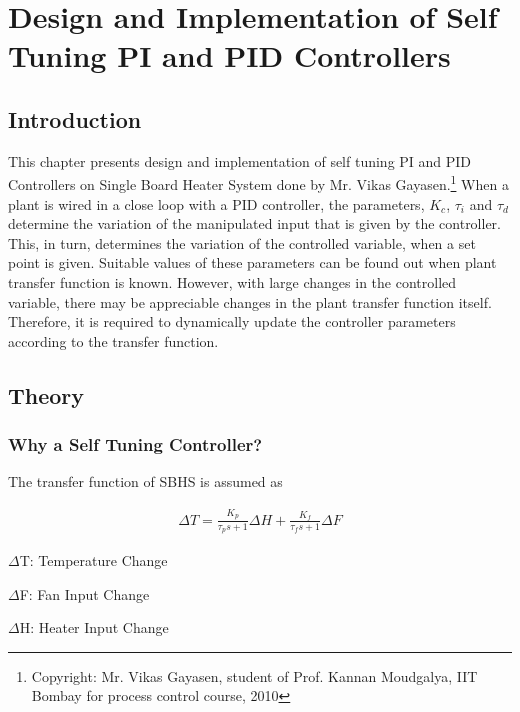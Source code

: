 
\chapter{Design and Implementation of Self Tuning PI and PID Controllers}

\section{Introduction}%
This chapter presents design and implementation of self tuning PI and PID Controllers on Single Board Heater System done by Mr. Vikas Gayasen.\footnote{Copyright: Mr. Vikas Gayasen, student of Prof. Kannan Moudgalya, IIT Bombay for process control course, 2010}
When a plant is wired in a close loop with a PID controller, the parameters, $K_c$, $\tau_i$ and $\tau_d$ determine the variation of the manipulated input that is given by the controller. This, in turn, determines the variation of the controlled variable, when a set point is given. Suitable values of these parameters can be found out when plant transfer function is known. However, with large changes in the controlled variable, there may be appreciable changes in the plant transfer function itself. Therefore, it is required to dynamically update the controller parameters according to the transfer function.





\section{Theory}
\subsection{Why a Self Tuning Controller?}
The transfer function of SBHS is assumed as 


\begin{align}
\Delta T = \frac {K_p}{\tau_ps+1} \Delta H + \frac {K_f}{\tau_fs+1} \Delta F 
\end{align}
 
$\Delta$T: Temperature Change

$\Delta$F: Fan Input Change

$\Delta$H: Heater Input Change\\

